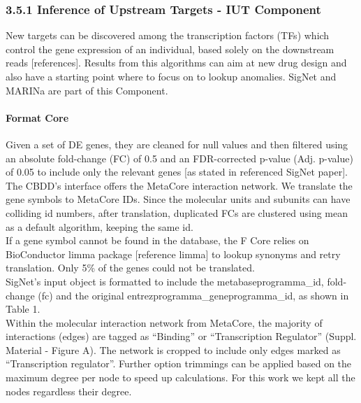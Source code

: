 \subsubsection{3.5.1 Inference of Upstream Targets - IUT Component}
New targets can be discovered among the transcription factors (TFs) which control the gene expression of an individual, based solely on the downstream reads [references]. Results from this algorithms can aim at new drug design and also have a starting point where to focus on to lookup anomalies. SigNet and MARINa are part of this Component.

\paragraph{Format Core}
\label{section:iut-f}
Given a set of DE genes, they are cleaned for null values and then filtered using an absolute fold-change (FC) of 0.5 and an FDR-corrected p-value (Adj. p-value) of 0.05 to include only the relevant genes [as stated in referenced SigNet paper].
\\

The CBDD's interface offers the MetaCore interaction network. We translate the gene symbols to MetaCore IDs. Since the molecular units and subunits can have colliding id numbers, after translation, duplicated FCs are clustered using mean as a default algorithm, keeping the same id.
\\

If a gene symbol cannot be found in the database, the F Core relies on BioConductor limma package [reference limma] to lookup synonyms and retry translation. Only 5\% of the genes could not be translated.
\\

SigNet’s input object is formatted to include the metabaseprogramma\_id, fold-change (fc) and the original entrezprogramma\_geneprogramma\_id, as shown in Table 1.
\\

Within the molecular interaction network from MetaCore, the majority of interactions (edges) are tagged as “Binding” or “Transcription Regulator” (Suppl. Material - Figure A). The network is cropped to include only edges marked as “Transcription regulator”. Further option trimmings can be applied based on the maximum degree per node to speed up calculations. For this work we kept all the nodes regardless their degree.

